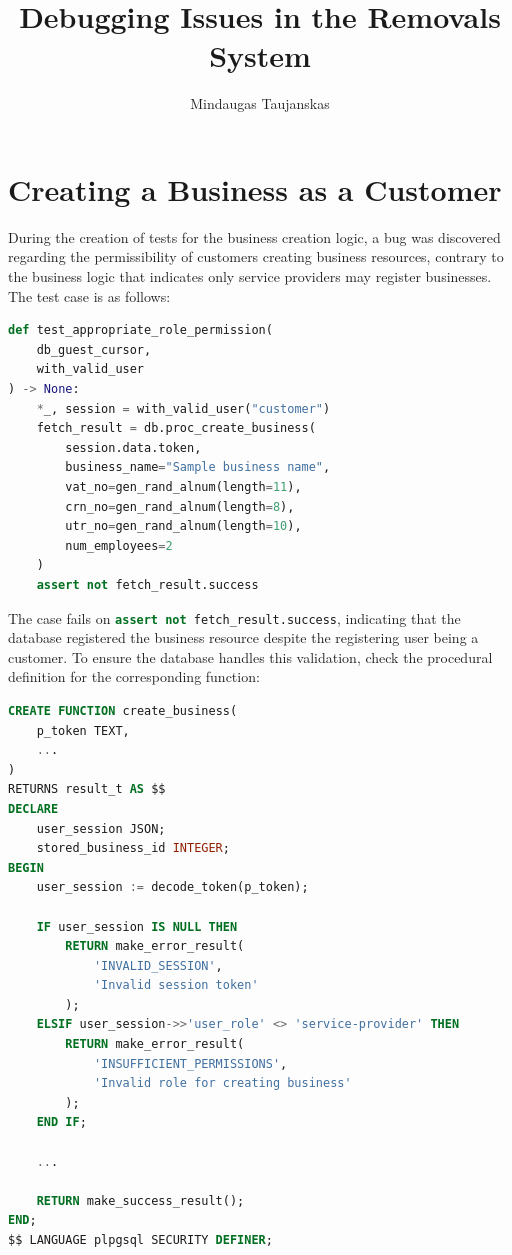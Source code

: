 \documentclass[journal]{IEEEtran}
\begin{document}
	
	\title{Debugging Issues in the Removals System}
	
	\author{Mindaugas Taujanskas}
	
	\maketitle
	
	\section{Creating a Business as a Customer}
	
	During the creation of tests for the business creation logic, a bug was discovered regarding the permissibility of customers creating business resources, contrary to the business logic that indicates only service providers may register businesses. The test case is as follows:
	
	\begin{lstlisting}[language=Python]
def test_appropriate_role_permission(
	db_guest_cursor,
	with_valid_user
) -> None:
	*_, session = with_valid_user("customer")
	fetch_result = db.proc_create_business(
		session.data.token,
		business_name="Sample business name",
		vat_no=gen_rand_alnum(length=11),
		crn_no=gen_rand_alnum(length=8),
		utr_no=gen_rand_alnum(length=10),
		num_employees=2
	)
	assert not fetch_result.success
	\end{lstlisting}
	
	The case fails on \lstinline[language=Python]|assert not fetch_result.success|, indicating that the database registered the business resource despite the registering user being a customer. To ensure the database handles this validation, check the procedural definition for the corresponding function:
	
	\begin{lstlisting}[language=SQL]
CREATE FUNCTION create_business(
	p_token TEXT,
	...
)
RETURNS result_t AS $$
DECLARE
	user_session JSON;
	stored_business_id INTEGER;
BEGIN
	user_session := decode_token(p_token);
	
	IF user_session IS NULL THEN
		RETURN make_error_result(
			'INVALID_SESSION',
			'Invalid session token'
		);
	ELSIF user_session->>'user_role' <> 'service-provider' THEN
		RETURN make_error_result(
			'INSUFFICIENT_PERMISSIONS',
			'Invalid role for creating business'
		);
	END IF;
	
	...
	
	RETURN make_success_result();
END;
$$ LANGUAGE plpgsql SECURITY DEFINER;
	\end{lstlisting}
	
\end{document}
